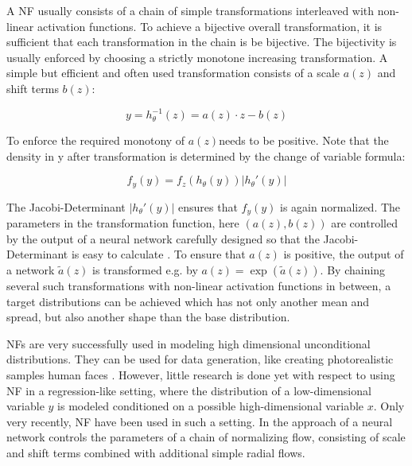 \documentclass[a4paper,conference]{IEEEtran}
\begin{document}
A NF usually consists of a chain of simple transformations interleaved with non-linear activation functions. To achieve a bijective overall transformation, it is sufficient that each transformation in the chain is be bijective. The bijectivity is usually enforced by choosing a strictly monotone increasing transformation. A simple but efficient and often used transformation consists of a scale $a(z)$ and shift terms $b(z)$:

\begin{equation}
    y=h_\theta^{-1}(z) = a(z) \cdot z - b(z)
\end{equation}

To enforce the required monotony of $a(z) $needs to be positive. Note that the density in y after transformation is determined by the change of variable formula: 

\begin{equation}
f_y(y)=f_z(h_\theta(y))|h_\theta'(y)|
\end{equation}

The Jacobi-Determinant $|h_\theta'(y)|$ ensures that $f_y(y)$ is again normalized. The parameters in the transformation function, here  $(a(z), b(z))$ are controlled by the output of a neural network carefully designed so that the Jacobi-Determinant is easy to calculate \cite{Papamakarios2019}. To ensure that $a(z)$ is positive, the output of a network $\tilde a(z)$ is transformed e.g. by $a(z)=\exp(\tilde a(z))$. By chaining several such transformations with non-linear activation functions in between, a target distributions can be achieved which has not only another mean and spread, but also another shape than the base distribution.

NFs are very successfully used in modeling high dimensional unconditional distributions.  They can be used for data generation, like creating photorealistic samples human faces \cite{Kingma2018}. However, little research is done yet with respect to using NF in a regression-like setting, where the distribution of a low-dimensional variable $y$ is modeled conditioned on a possible high-dimensional variable $x$. Only very recently, NF have been used in such a setting. In the approach of \cite{Rothfuss} a neural network controls the parameters of a chain of normalizing flow, consisting of scale and shift terms combined with additional simple radial flows. 
\end{document}
